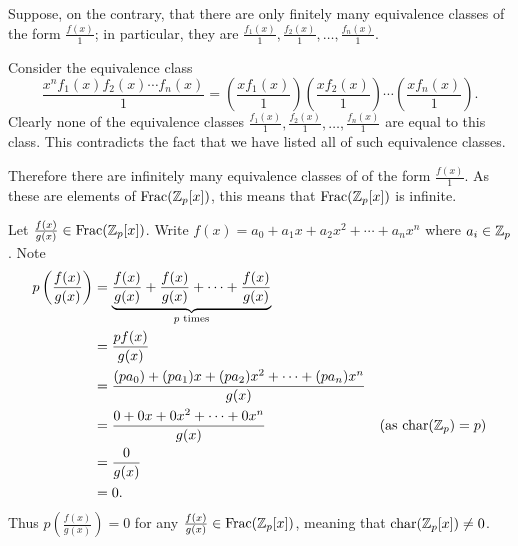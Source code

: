 \begin{questions}
\begin{partquestions}{\alph*}
        Suppose, on the contrary, that there are only finitely many equivalence classes of the form $\frac{f(x)}1$; in particular, they are $\frac{f_1(x)}1, \frac{f_2(x)}1, \dots, \frac{f_n(x)}1$.

        Consider the equivalence class
        \[
            \frac{x^nf_1(x)f_2(x)\cdots f_n(x)}{1} = \left(\frac{xf_1(x)}{1}\right)\left(\frac{xf_2(x)}{1}\right)\cdots\left(\frac{xf_n(x)}{1}\right).
        \]
        Clearly none of the equivalence classes $\frac{f_1(x)}1, \frac{f_2(x)}1, \dots, \frac{f_n(x)}1$ are equal to this class. This contradicts the fact that we have listed all of such equivalence classes.

        Therefore there are infinitely many equivalence classes of of the form $\frac{f(x)}1$. As these are elements of $\mathrm{Frac}(\mathbb{Z}_p[x])$, this means that $\mathrm{Frac}(\mathbb{Z}_p[x])$ is infinite.

        \item Let $\frac{f(x)}{g(x)} \in \mathrm{Frac}(\mathbb{Z}_p[x])$. Write $f(x) = a_0 + a_1x + a_2x^2 + \cdots + a_nx^n$ where $a_i \in \mathbb{Z}_p$. Note
        \begin{align*}
            p\left(\frac{f(x)}{g(x)}\right) &= \underbrace{\frac{f(x)}{g(x)} + \frac{f(x)}{g(x)} + \cdots + \frac{f(x)}{g(x)}}_{p \text{ times}}\\
            &= \frac{pf(x)}{g(x)}\\
            &= \frac{(pa_0) + (pa_1)x + (pa_2)x^2 + \cdots + (pa_n)x^n}{g(x)}\\
            &= \frac{0 + 0x + 0x^2 + \cdots + 0x^n}{g(x)} & (\text{as }\mathrm{char}(\mathbb{Z}_p) = p)\\
            &= \frac0{g(x)}\\
            &= 0.
        \end{align*}
        Thus $p\left(\frac{f(x)}{g(x)}\right) = 0$ for any $\frac{f(x)}{g(x)} \in \mathrm{Frac}(\mathbb{Z}_p[x])$, meaning that $\mathrm{char}(\mathbb{Z}_p[x]) \neq 0$.
    \end{partquestions}
\end{questions}
